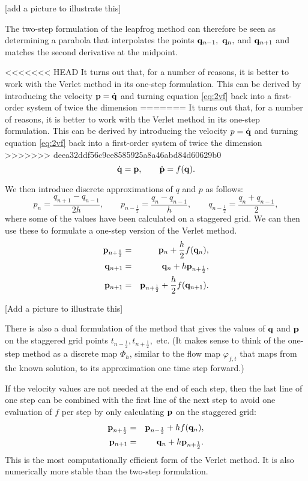 [add a picture to illustrate this]

The two-step formulation of the leapfrog method can therefore be seen as determining a parabola that interpolates the points ${\bf q}_{n-1},~{\bf q}_{n},$ and ${\bf q}_{n+1}$ and matches the second derivative at the midpoint.

<<<<<<< HEAD
It turns out that, for a number of reasons, it is better to work with the Verlet method in its one-step formulation. This can be derived by introducing the velocity ${\bf p}=\dot{\bf q}$ and turning equation \ref{eq:2vf} back into a first-order system of twice the dimension
=======
It turns out that, for a number of reasons, it is better to work with the Verlet method in its one-step formulation. This can be derived by introducing the velocity $p=\dot{\bf q}$ and turning equation \ref{eq:2vf} back into a first-order system of twice the dimension
>>>>>>> deea32ddf56c9ce8585925a8a46abd84d60629b0
$$
	\dot{\bf q} = {\bf p},\qquad \dot{\bf p} = f({\bf q}).
$$

We then introduce discrete approximations of $q$ and $p$ as follows:
$$
p_n =\frac{q_{n+1}-q_{n-1}}{2h},\qquad p_{n-\frac12} = \frac{q_n-q_{n-1}}{h}, \qquad q_{n-\frac12} = \frac{q_n + q_{n-1}}{2},
$$
where some of the values have been calculated on a staggered grid. We can then use these to formulate a one-step version of the Verlet method. 
\begin{eqnarray*}
	{\bf p}_{n+\frac12} &=& {\bf p}_n+\frac{h}{2}f({\bf q}_n),\\
	{\bf q}_{n+1} &=& {\bf q}_n +h{\bf p}_{n+\frac12},\\
	{\bf p}_{n+1} &=& {\bf p}_{n+\frac12}+\frac{h}{2}f({\bf q}_{n+1}).
\end{eqnarray*}

[Add a picture to illustrate this]

There is also a dual formulation of the method that gives the values of ${\bf q}$ and ${\bf p}$ on the staggered grid points $t_{n-\frac12},t_{n+\frac12},$ etc.
(It makes sense to think of the one-step method as a discrete map $\Phi_h$, similar to the flow map $\varphi_{f,t}$ that maps from the known solution, to its approximation one time step forward.)

If the velocity values are not needed at the end of each step, then the last line of one step can be combined with the first line of the next step to avoid one evaluation of $f$ per step by only calculating ${\bf p}$ on the staggered grid:
\begin{eqnarray*}
	{\bf p}_{n+\frac12} &=& {\bf p}_{n-\frac12}+hf({\bf q}_n),\\
	{\bf p}_{n+1} &=& {\bf q}_n +h{\bf p}_{n+\frac12}.
\end{eqnarray*}
This is the most computationally efficient form of the Verlet method. It is also numerically more stable than the two-step formulation.

